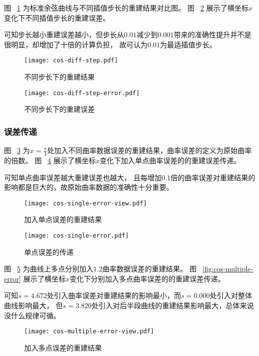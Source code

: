图 ~\ref{fig:cos-diff-step} 为标准余弦曲线与不同插值步长的重建结果对比图。
图 ~\ref{fig:cos-diff-step-error} 展示了横坐标$x$变化下不同插值步长的重建误差。

可知步长越小重建误差越小，但步长从$0.01$减少到$0.001$带来的准确性提升并不是很明显，却增加了十倍的计算负担，
故可认为$0.01$为最适插值步长。

\begin{figure}[H]
\centering
\texttt{[image: cos-diff-step.pdf]}
\caption{不同步长下的重建结果}
\label{fig:cos-diff-step}
\end{figure}

\begin{figure}[H]
\centering
\texttt{[image: cos-diff-step-error.pdf]}
\caption{不同步长下的重建误差}
\label{fig:cos-diff-step-error}
\end{figure}

\subsubsection{误差传递}

图 ~\ref{fig:cos-single-error-view} 为$x = \frac{\pi}{4}$处加入不同曲率数据误差的重建结果，曲率误差的定义为原始曲率的倍数。
图 ~\ref{fig:cos-single-error} 展示了横坐标$x$变化下加入单点曲率误差的的重建误差传递。

可知单点曲率误差越大重建误差也越大，
且每增加$0.1$倍的曲率误差对重建结果的影响都是巨大的，故原始曲率数据的准确性十分重要。

\begin{figure}[H]
\centering
\texttt{[image: cos-single-error-view.pdf]}
\caption{加入单点误差的重建结果}
\label{fig:cos-single-error-view}
\end{figure}

\begin{figure}[H]
\centering
\texttt{[image: cos-single-error.pdf]}
\caption{单点误差的传递}
\label{fig:cos-single-error}
\end{figure}

图 ~\ref{fig:cos-multiple-error-view} 为曲线上多点分别加入$1.2$曲率数据误差的重建结果。
图 ~\ref{fig:cos-multiple-error} 展示了横坐标$x$变化下分别加入多点曲率误差的的重建误差传递。

可知$s=4.672$处引入曲率误差对重建结果的影响最小，而$s=0.000$处引入对整体曲线影响最大，
但$s=3.820$处引入对后半段曲线的重建结果影响最大，总体来说没什么规律可循。

\begin{figure}[H]
\centering
\texttt{[image: cos-multiple-error-view.pdf]}
\caption{加入多点误差的重建结果}
\label{fig:cos-multiple-error-view}
\end{figure}

